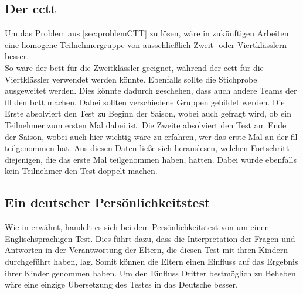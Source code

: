 \subsection*{Der \acrlong{cctt}}
Um das Problem aus \ref{sec:problemCTT} zu lösen, wäre in zukünftigen Arbeiten eine homogene Teilnehmergruppe von ausschließlich Zweit- oder Viertklässlern besser.\\
So wäre der \acrshort{bctt} für die Zweitklässler geeignet, während der \acrshort{cctt} für die Viertklässler verwendet werden könnte.
Ebenfalls sollte die Stichprobe ausgeweitet werden. Dies könnte dadurch geschehen, dass auch andere Teams der \acrshort{fll} den \acrshort{bctt} machen. Dabei sollten verschiedene Gruppen gebildet werden. Die Erste absolviert den Test zu Beginn der Saison, wobei auch gefragt wird, ob ein Teilnehmer zum ersten Mal dabei ist. Die Zweite absolviert den Test am Ende der Saison, wobei auch hier wichtig wäre zu erfahren, wer das erste Mal an der \acrshort{fll} teilgenommen hat. Aus diesen Daten ließe sich herauslesen, welchen Fortschritt diejenigen, die das erste Mal teilgenommen haben, hatten. Dabei würde ebenfalls kein Teilnehmer den Test doppelt machen.

\subsection*{Ein deutscher Persönlichkeitstest}
Wie in erwähnt, handelt es sich bei dem Persönlichkeitstest von  um einen Englischsprachigen Test. Dies führt dazu, dass die Interpretation der Fragen und Antworten in der Verantwortung der Eltern, die diesen Test mit ihren Kindern durchgeführt haben, lag. Somit können die Eltern einen Einfluss auf das Ergebnis ihrer Kinder genommen haben. Um den Einfluss Dritter bestmöglich zu Beheben wäre eine einzige Übersetzung des Testes in das Deutsche besser.


